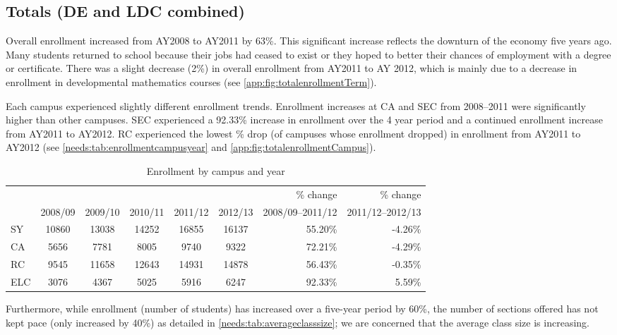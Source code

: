 \subsection{Totals (DE and LDC combined)}
Overall enrollment increased from AY2008 to AY2011 by 63\%. This significant
increase reflects the downturn of the economy five years ago. Many students
returned to school because their jobs had ceased to exist or they hoped to
better their chances of employment with a degree or certificate. There was a
slight decrease (2\%) in overall enrollment from AY2011 to AY 2012, which is
mainly due to a decrease in enrollment in developmental mathematics courses
(see \vref{app:fig:totalenrollmentTerm}).


Each campus experienced slightly different enrollment trends. Enrollment
increases at CA and SEC from 2008--2011 were significantly higher than other
campuses. SEC experienced a 92.33\% increase in enrollment over the 4 year
period and a continued enrollment increase from AY2011 to AY2012. RC
experienced the lowest \% drop (of campuses whose enrollment dropped)  in
enrollment from AY2011 to AY2012 (see \vref{needs:tab:enrollmentcampusyear} and
\vref{app:fig:totalenrollmentCampus}).

\begin{table}[!htb]
	\centering
	\caption{Enrollment by campus and year}
	\label{needs:tab:enrollmentcampusyear}
	\begin{tabular}{l*{5}{c}rr}
		\toprule
		    &        &        &        &        &        & \% change & \% change \\
		    & 2008/09 & 2009/10 & 2010/11 & 2011/12 & 2012/13 & 2008/09--2011/12 & 2011/12--2012/13 \\
		\midrule
		SY  & 10860  & 13038  & 14252  & 16855  & 16137  & 55.20\%   & -4.26\%   \\
		CA  & 5656   & 7781   & 8005   & 9740   & 9322   & 72.21\%   & -4.29\%   \\
		RC  & 9545   & 11658  & 12643  & 14931  & 14878  & 56.43\%   & -0.35\%   \\
		ELC & 3076   & 4367   & 5025   & 5916   & 6247   & 92.33\%   & 5.59\%    \\
		\bottomrule
	\end{tabular}
\end{table}

Furthermore, while enrollment (number of students) has increased over a
five-year period by 60\%, the number of sections offered has not kept pace
(only increased by 40\%) as detailed in \cref{needs:tab:averageclasssize}; we
are concerned that the average class size is increasing.

